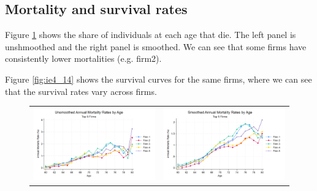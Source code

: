 \documentclass[12pt]{article}
\begin{document}
\subsection{Mortality and survival rates}

Figure \ref{fig:ie4_13} shows the share of individuals at each age that die. The left panel is unshmoothed and the right panel is smoothed. We can see that some firms have consistently lower mortalities (e.g. firm2). 

Figure \ref{fig:ie4_14} shows the survival curves for the same firms, where we can see that the survival rates vary across firms.
\begin{figure}[H]
\caption{}
\label{fig:ie4_13}
\centering{}%
\begin{tabular}{cc}
\includegraphics[scale=0.17]{figures/IE4/IE4_mortality_rates_unsmoothed.png} 
& \includegraphics[scale=0.17]{figures/IE4/IE4_mortality_rates_smoothed.png} 
\end{tabular}
\end{figure} 
 
\end{document}
